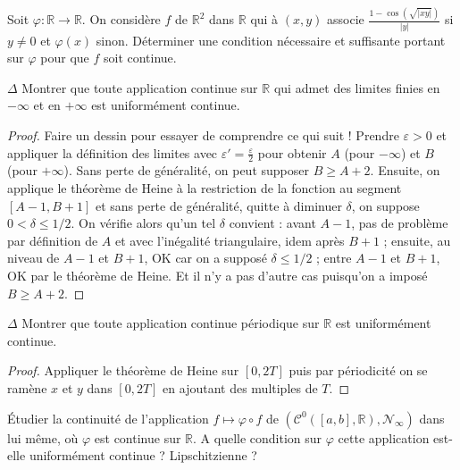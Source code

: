 \documentclass[french,a4paper]{article}
\newcommand{\R}{\mathbb{R}}
\theoremstyle{plain}
\theoremstyle{definition}
\theoremstyle{remark}
\begin{document}
\begin{ex}{}
	Soit $\varphi:\R\to\R$. On considère $f$ de $\R^2$ dans $\R$ qui à $(x,y)$ associe $\displaystyle\frac{1-\cos(\sqrt{\lvert xy\rvert})}{\lvert y\rvert}$ si $y\ne 0$ et $\varphi(x)$ sinon. Déterminer une condition nécessaire et suffisante portant sur $\varphi$ pour que $f$ soit continue.
\end{ex}

\begin{ex}{$\Delta$}
	Montrer que toute application continue sur $\R$ qui admet des limites finies en $-\infty$ et en $+\infty$ est uniformément continue.
\end{ex}
\begin{proof}
	Faire un dessin pour essayer de comprendre ce qui suit ! Prendre $\varepsilon>0$ et appliquer la définition des limites avec $\varepsilon'=\displaystyle\frac{\varepsilon}{2}$ pour obtenir $A$ (pour $-\infty$) et $B$ (pour $+\infty$). Sans perte de généralité, on peut supposer $B\geqslant A+2$. Ensuite, on applique le théorème de Heine à la restriction de la fonction au segment $[A-1,B+1]$ et sans perte de généralité, quitte à diminuer $\delta$, on suppose $0<\delta\leqslant1/2$. On vérifie alors qu'un tel $\delta$ convient : avant $A-1$, pas de problème par définition de $A$ et avec l'inégalité triangulaire, idem après $B+1$ ; ensuite, au niveau de $A-1$ et $B+1$, OK car on a supposé $\delta\leqslant1/2$ ; entre $A-1$ et $B+1$, OK par le théorème de Heine. Et il n'y a pas d'autre cas puisqu'on a imposé $B\geqslant A+2$.
\end{proof}

\begin{ex}{$\Delta$}
	Montrer que toute application continue périodique sur $\R$ est uniformément continue.
\end{ex}
\begin{proof}
	Appliquer le théorème de Heine sur $[0,2T]$ puis par périodicité on se ramène $x$ et $y$ dans $[0,2T]$ en ajoutant des multiples de $T$.
\end{proof}

\begin{ex}{}
	Étudier la continuité de l'application $f\mapsto\varphi\circ f$ de $\left(\mathcal{C}^0([a,b],\R),\mathcal{N}_\infty\right)$ dans lui même, où $\varphi$ est continue sur $\R$. A quelle condition sur $\varphi$ cette application est-elle uniformément continue ? Lipschitzienne ?
\end{ex}
\end{document}
